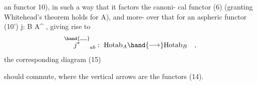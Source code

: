 
an  functor 10), in such a way  that it factors the canoni-%
cal functor (6) (granting Whitehead's theorem holds for A), and more-%
over that for an aspheric functor (10') j: B \hand{$\longrightarrow$} A\^{} , giving rise
to
\[ \overset{\hand{\rule{1em}{0.4pt}}}{j^{*}}_{ab} :\ \mathrm{Hotab}_{A} \hand{\longrightarrow} \mathrm{Hotab}_{B} \quad , \]
the corresponding diagram
(15)

should commute, where the vertical arrows are the functors (14).

